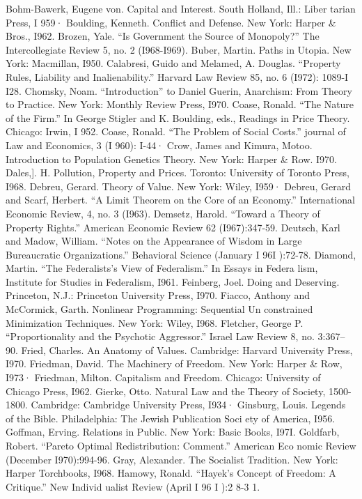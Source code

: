 \documentclass[11pt,openany]{book}
\begin{document}
{Bohm-Bawerk, Eugene von. Capital and Interest. South Holland, Ill.: Liber tarian Press, I 959· Boulding, Kenneth. Conflict and Defense. New York: Harper \& Bros., I962. Brozen, Yale. ``Is Government the Source of Monopoly?'' The Intercollegiate Review 5, no. 2 (I968-I969). Buber, Martin. Paths in Utopia. New York: Macmillan, I950. Calabresi, Guido and Melamed, A. Douglas. ``Property Rules, Liability and Inalienability.'' Harvard Law Review 85, no. 6 (I972): 1089-I I28. Chomsky, Noam. ``Introduction'' to Daniel Guerin, Anarchism: From Theory to Practice. New York: Monthly Review Press, I970. Coase, Ronald. ``The Nature of the Firm.'' In George Stigler and K. Boulding, eds., Readings in Price Theory. Chicago: Irwin, I 952. Coase, Ronald. ``The Problem of Social Costs.'' journal of Law and Economics, 3 (I 960): I-44· Crow, James and Kimura, Motoo. Introduction to Population Genetics Theory. New York: Harper \& Row. I970. Dales,]. H. Pollution, Property and Prices. Toronto: University of Toronto Press, I968. Debreu, Gerard. Theory of Value. New York: Wiley, I959· Debreu, Gerard and Scarf, Herbert. ``A Limit Theorem on the Core of an Economy.'' International Economic Review, 4, no. 3 (I963). Demsetz, Harold. ``Toward a Theory of Property Rights.'' American Economic Review 62 (I967):347-59. Deutsch, Karl and Madow, William. ``Notes on the Appearance of Wisdom in Large Bureaucratic Organizations.'' Behavioral Science (January I 96I ):72-78. Diamond, Martin. ``The Federalists's View of Federalism.'' In Essays in Federa lism, Institute for Studies in Federalism, I961. Feinberg, Joel. Doing and Deserving. Princeton, N.J.: Princeton University Press, I970. Fiacco, Anthony and McCormick, Garth. Nonlinear Programming: Sequential Un constrained Minimization Techniques. New York: Wiley, I968. Fletcher, George P. ``Proportionality and the Psychotic Aggressor.'' Israel Law Review 8, no. 3:367--90. Fried, Charles. An Anatomy of Values. Cambridge: Harvard University Press, I970. Friedman, David. The Machinery of Freedom. New York: Harper \& Row, I973· Friedman, Milton. Capitalism and Freedom. Chicago: University of Chicago Press, I962. Gierke, Otto. Natural Law and the Theory of Society, 1500-1800. Cambridge: Cambridge University Press, I934· Ginsburg, Louis. Legends of the Bible. Philadelphia: The Jewish Publication Soci ety of America, I956. Goffman, Erving. Relations in Public. New York: Basic Books, I97I. Goldfarb, Robert. ``Pareto Optimal Redistribution: Comment.'' American Eco nomic Review (December I970):994-96. Gray, Alexander. The Socialist Tradition. New York: Harper Torchbooks, I968. Hamowy, Ronald. ``Hayek's Concept of Freedom: A Critique.'' New Individ ualist Review (April I 96 I ):2 8-3 1.\par

}
\end{document}
